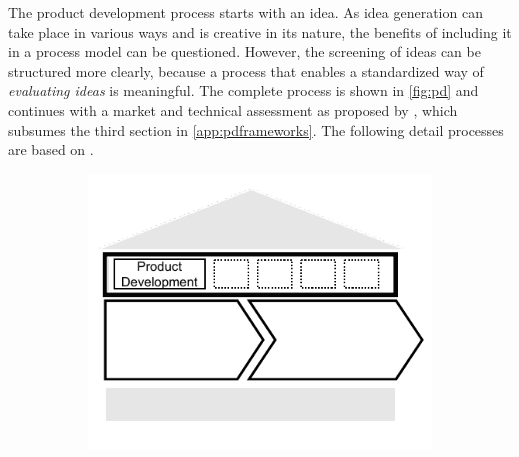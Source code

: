 	 The product development process starts with an idea. As idea generation can take place in various ways and is  creative in its nature, the benefits of including it in a process model can be questioned. However, the screening of ideas can be structured more clearly, because a process that enables a standardized way of \textit{evaluating ideas} is meaningful. The complete process is shown in \Fig \ref{fig:pd} and continues with a market and technical assessment as proposed by \citep{Edgett_1996}, which subsumes the third section in \ref{app:pdframeworks}. The following detail processes are based on \citep{cowell1988new}. 
	
	 
	\begin{figure}[caption={Product Development process}, label={fig:pd}]
		\begin{subfigure}[c]{.45\textwidth}
			\begin{center}
				\includegraphics{figures/processes/productdevelopment.pdf}
			\end{center}
		\end{subfigure}
		\begin{subfigure}[c]{.45\textwidth}
			\begin{center}
			\end{center}
		\end{subfigure}
		
	\end{figure}

